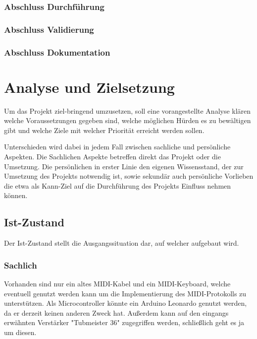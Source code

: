 \documentclass[10pt,a4paper]{report}
\begin{document}
\subsection{Abschluss Durchführung}
\subsection{Abschluss Validierung}
\subsection{Abschluss Dokumentation}

\chapter{Analyse und Zielsetzung}

\begin{flushleft}

Um das Projekt ziel-bringend umzusetzen, soll eine vorangestellte Analyse klären welche Voraussetzungen gegeben sind, welche möglichen Hürden es zu bewältigen gibt und welche Ziele mit welcher Priorität erreicht werden sollen.

Unterschieden wird dabei in jedem Fall zwischen sachliche und persönliche Aspekten. Die Sachlichen Aspekte betreffen direkt das Projekt oder die Umsetzung. Die persönlichen in erster Linie den eigenen Wissensstand, der zur Umsetzung des Projekts notwendig ist, sowie sekundär auch persönliche Vorlieben die etwa als Kann-Ziel auf die Durchführung des Projekts Einfluss nehmen können. 

\end{flushleft}

\section{Ist-Zustand}

Der Ist-Zustand stellt die Ausgangssituation dar, auf welcher aufgebaut wird. 

	\subsection{Sachlich}
	\begin{flushleft}
	Vorhanden sind nur ein altes MIDI-Kabel und ein MIDI-Keyboard, welche eventuell genutzt werden kann um die Implementierung des MIDI-Protokolls zu unterstützen. Als Microcontroller könnte ein Arduino Leonardo genutzt werden, da er derzeit keinen anderen Zweck hat. Außerdem kann auf den eingangs erwähnten Verstärker "Tubmeister 36" zugegriffen werden, schließlich geht es ja um diesen. 
	\end{flushleft}
\end{document}
